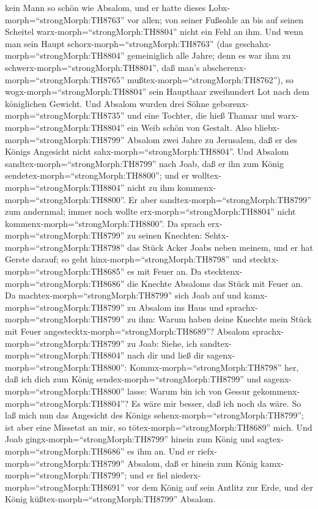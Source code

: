 kein Mann so schön wie Absalom, und er hatte dieses
Lobx-morph=``strongMorph:TH8763'' vor allen; von seiner Fußsohle an bis
auf seinen Scheitel warx-morph=``strongMorph:TH8804'' nicht ein Fehl an
ihm.  Und wenn man sein Haupt
schorx-morph=``strongMorph:TH8763'' (das
geschahx-morph=``strongMorph:TH8804'' gemeiniglich alle Jahre; denn es
war ihm zu schwerx-morph=``strongMorph:TH8804'', daß man's
abscherenx-morph=``strongMorph:TH8765''
mußtex-morph=``strongMorph:TH8762''), so
wogx-morph=``strongMorph:TH8804'' sein Haupthaar zweihundert Lot nach
dem königlichen Gewicht.  Und Absalom wurden drei Söhne
geborenx-morph=``strongMorph:TH8735'' und eine Tochter, die hieß Thamar
und warx-morph=``strongMorph:TH8804'' ein Weib schön von Gestalt.
 Also bliebx-morph=``strongMorph:TH8799'' Absalom zwei
Jahre zu Jerusalem, daß er des Königs Angesicht nicht
sahx-morph=``strongMorph:TH8804''.  Und Absalom
sandtex-morph=``strongMorph:TH8799'' nach Joab, daß er ihn zum König
sendetex-morph=``strongMorph:TH8800''; und er
wolltex-morph=``strongMorph:TH8804'' nicht zu ihm
kommenx-morph=``strongMorph:TH8800''. Er aber
sandtex-morph=``strongMorph:TH8799'' zum andernmal; immer noch wollte
erx-morph=``strongMorph:TH8804'' nicht
kommenx-morph=``strongMorph:TH8800''.  Da sprach
erx-morph=``strongMorph:TH8799'' zu seinen Knechten:
Sehtx-morph=``strongMorph:TH8798'' das Stück Acker Joabs neben meinem,
und er hat Gerste darauf; so geht hinx-morph=``strongMorph:TH8798'' und
stecktx-morph=``strongMorph:TH8685'' es mit Feuer an. Da
stecktenx-morph=``strongMorph:TH8686'' die Knechte Absaloms das Stück
mit Feuer an.  Da machtex-morph=``strongMorph:TH8799'' sich
Joab auf und kamx-morph=``strongMorph:TH8799'' zu Absalom ins Haus und
sprachx-morph=``strongMorph:TH8799'' zu ihm: Warum haben deine Knechte
mein Stück mit Feuer angestecktx-morph=``strongMorph:TH8689''?
 Absalom sprachx-morph=``strongMorph:TH8799'' zu Joab:
Siehe, ich sandtex-morph=``strongMorph:TH8804'' nach dir und ließ dir
sagenx-morph=``strongMorph:TH8800'': Kommx-morph=``strongMorph:TH8798''
her, daß ich dich zum König sendex-morph=``strongMorph:TH8799'' und
sagenx-morph=``strongMorph:TH8800'' lasse: Warum bin ich von Gessur
gekommenx-morph=``strongMorph:TH8804''? Es wäre mir besser, daß ich noch
da wäre. So laß mich nun das Angesicht des Königs
sehenx-morph=``strongMorph:TH8799''; ist aber eine Missetat an mir, so
tötex-morph=``strongMorph:TH8689'' mich.  Und Joab
gingx-morph=``strongMorph:TH8799'' hinein zum König und
sagtex-morph=``strongMorph:TH8686'' es ihm an. Und er
riefx-morph=``strongMorph:TH8799'' Absalom, daß er hinein zum König
kamx-morph=``strongMorph:TH8799''; und er fiel
niederx-morph=``strongMorph:TH8691'' vor dem König auf sein Antlitz zur
Erde, und der König küßtex-morph=``strongMorph:TH8799'' Absalom.


